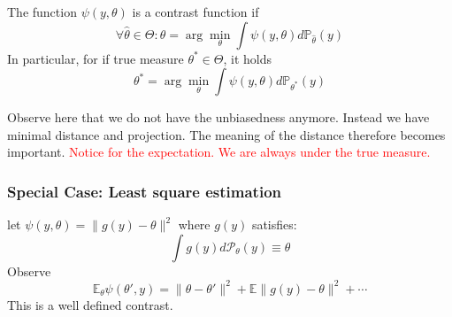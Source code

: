 \begin{definition}
	The function $\psi(y, \theta)$ is a contrast function if
	\begin{equation*}
		\forall \hat{\theta} \in \Theta: 
		\hat{\theta} = \arg\min_{\theta} \int \psi(y, \theta) d\mathbb{P}_{\hat{\theta}}(y)
	\end{equation*} 
	In particular, for if true measure $\theta^* \in \Theta$, it holds 
	\begin{equation*}
		\theta^* = \arg\min_\theta \int \psi(y, \theta) d\mathbb{P}_{\theta^*}(y)
	\end{equation*}

\end{definition}
Observe here that we do not have the unbiasedness anymore. Instead we have minimal distance and projection. The meaning of the distance therefore becomes important. \textcolor{red}{Notice for the expectation. We are always under the true measure.} \par 

\subsubsection*{Special Case: Least square estimation}
let $\psi(y, \theta) = \| g(y) - \theta \|^2$ where $g(y)$ satisfies:
\begin{equation*}
	\int g(y) d\mathcal{P}_\theta(y) \equiv \theta
\end{equation*}
Observe
\begin{equation*}
	\mathbb{E}_\theta \psi(\theta', y) = \| \theta - \theta' \|^2 + \mathbb{E}\|g(y) - \theta\|^2 + \cdots
\end{equation*}
This is a well defined contrast.



